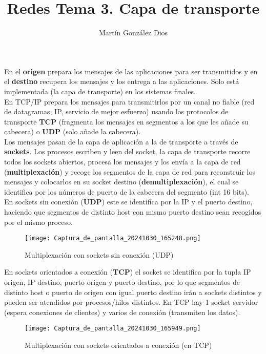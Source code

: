 \documentclass{article}
\title{Redes Tema 3. Capa de transporte}
\author{Martín González Dios}
\begin{document}
\maketitle

En el \textbf{origen} prepara los mensajes de las aplicaciones para ser transmitidos y en el \textbf{destino} recupera los mensajes y los entrega a las aplicaciones. Solo está implementada (la capa de transporte) en los sistemas finales. \\

En TCP/IP prepara los mensajes para transmitirlos por un canal no fiable (red de datagramas, IP,
servicio de mejor esfuerzo) usando los protocolos de transporte \textbf{TCP} (fragmenta los mensajes en
segmentos a los que les añade su cabecera) o \textbf{UDP} (solo añade la cabecera). \\

Los mensajes pasan de la capa de aplicación a la de transporte a través de \textbf{sockets}. Los procesos escriben y leen del socket, la capa de transporte recorre todos los sockets abiertos, procesa los mensajes y los envía a la capa de red (\textbf{multiplexación}) y recoge los segmentos de la capa de red para reconstruir los mensajes y colocarlos en su socket destino (\textbf{demultiplexación}), el cual se identifica por los números de puerto de la cabecera del segmento (int 16 bits). \\

En sockets sin conexión (\textbf{UDP}) este se identifica por la IP y el puerto destino, haciendo que segmentos de distinto host con mismo puerto destino sean recogidos por el mismo proceso. \\

\begin{figure}[h]
    \centering
    \texttt{[image: Captura\_de\_pantalla\_20241030\_165248.png]} %
    \caption{Multiplexación con sockets sin conexión (UDP)}
    \label{fig:etiqueta}
\end{figure}

En sockets orientados a conexión (\textbf{TCP}) el socket se identifica por la tupla IP origen, IP destino, puerto origen y puerto destino, por lo que segmentos de distinto host o puerto de origen con igual puerto destino irán a sockets distintos y pueden ser atendidos por procesos/hilos distintos. En TCP hay 1 socket servidor (espera conexiones de clientes) y varios de conexión (transmiten los datos). \\
\begin{figure}[h]
    \centering
    \texttt{[image: Captura\_de\_pantalla\_20241030\_165949.png]} %
    \caption{Multiplexación con sockets orientados a conexión (en TCP)}
    \label{fig:etiqueta}
\end{figure}
\end{document}
